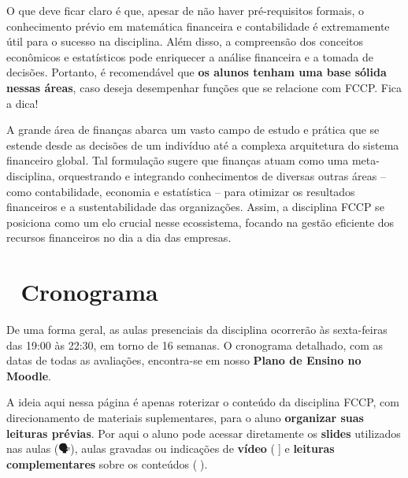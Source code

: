 \documentclass[
  a4paper,
]{book}
\begin{document}
O que deve ficar claro é que, apesar de não haver pré-requisitos
formais, o conhecimento prévio em matemática financeira e contabilidade
é extremamente útil para o sucesso na disciplina. Além disso, a
compreensão dos conceitos econômicos e estatísticos pode enriquecer a
análise financeira e a tomada de decisões. Portanto, é recomendável que
\textbf{os alunos tenham uma base sólida nessas áreas}, caso deseja
desempenhar funções que se relacione com FCCP. Fica a dica!

A grande área de finanças abarca um vasto campo de estudo e prática que
se estende desde as decisões de um indivíduo até a complexa arquitetura
do sistema financeiro global. Tal formulação sugere que finanças atuam
como uma meta-disciplina, orquestrando e integrando conhecimentos de
diversas outras áreas -- como contabilidade, economia e estatística --
para otimizar os resultados financeiros e a sustentabilidade das
organizações. Assim, a disciplina FCCP se posiciona como um elo crucial
nesse ecossistema, focando na gestão eficiente dos recursos financeiros
no dia a dia das empresas.


\chapter*{📅 Cronograma}\label{sec-schedule}


De uma forma geral, as aulas presenciais da disciplina ocorrerão às
sexta-feiras das 19:00 às 22:30, em torno de 16 semanas. O cronograma
detalhado, com as datas de todas as avaliações, encontra-se em nosso
\textbf{Plano de Ensino no Moodle}.

A ideia aqui nessa página é apenas roterizar o conteúdo da disciplina
FCCP, com direcionamento de materiais suplementares, para o aluno
\textbf{organizar suas leituras prévias}. Por aqui o aluno pode acessar
diretamente os \textbf{slides} utilizados nas aulas (🗣️), aulas gravadas
ou indicações de \textbf{vídeo} (🎥{]} e \textbf{leituras
complementares} sobre os conteúdos (📓).
\end{document}
